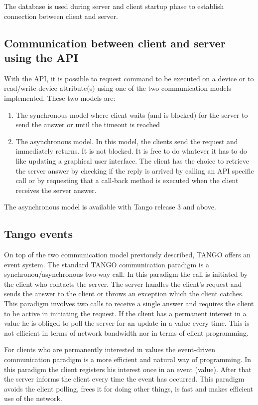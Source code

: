 \vspace{0.3cm}


The database is used during server and client startup phase to establish
connection between client and server.


\subsection{Communication between client and server using the API}

With the API, it is possible to request command to be executed on
a device or to read/write device attribute(s) using one of the two
communication models implemented. These two models are:
\begin{enumerate}
\item The synchronous model where client waits (and is blocked) for the
server to send the answer or until the timeout is reached
\item The asynchronous model. In this model, the clients send the request
and immediately returns. It is not blocked. It is free to do whatever
it has to do like updating a graphical user interface. The client
has the choice to retrieve the server answer by checking if the reply
is arrived by calling an API specific call or by requesting that a
call-back method is executed when the client receives the server answer.
\end{enumerate}
The asynchronous model is available with Tango release 3 and above.


\subsection{Tango events}

On top of the two communication model previously described, TANGO
offers an \textquotedbl{}event system\textquotedbl{}.
The standard TANGO communication paradigm is a synchronou/asynchronous
two-way call. In this paradigm the call is initiated by the client
who contacts the server. The server handles the client's request and
sends the answer to the client or throws an exception which the client
catches. This paradigm involves two calls to receive a single answer
and requires the client to be active in initiating the request. If
the client has a permanent interest in a value he is obliged to poll
the server for an update in a value every time. This is not efficient
in terms of network bandwidth nor in terms of client programming.

For clients who are permanently interested in values the event-driven
communication paradigm is a more efficient and natural way of programming.
In this paradigm the client registers his interest once in an event
(value). After that the server informs the client every time the event
has occurred. This paradigm avoids the client polling, frees it for
doing other things, is fast and makes efficient use of the network.

